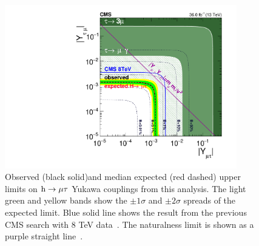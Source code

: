 \begin{figure}[!htpb]
  \centering
   \captionsetup{width=.9\textwidth,justification=centering}
 \includegraphics[width=0.9\textwidth]{plots_and_figures/chapter8/h125/yukawa.pdf}
 \caption{Observed (black solid)and median expected (red dashed) upper limits on $\text{h} \to \mu \tau$ Yukawa couplings from this analysis. The light green and yellow bands show the $\pm 1 \sigma$ and $\pm 2 \sigma$ spreads of the expected limit. Blue solid line shows the result from the previous CMS search with 8 TeV data~\cite{Khachatryan:2015kon}. The naturalness limit is shown as a purple straight line~\cite{HIG-17-001}.}
 \label{fig:yuk_coup}
\end{figure}


